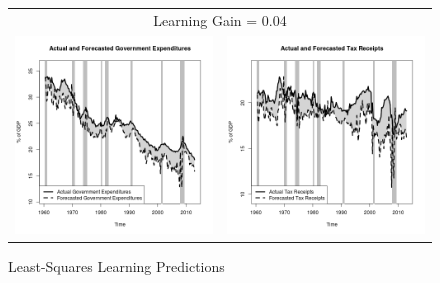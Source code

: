 \documentclass[11pt]{article}
\begin{document}
\begin{figure}\caption{Least-Squares Learning Predictions}\label{fg:forecasts0.04}
\begin{center}
\begin{tabular}{cc}
\multicolumn{2}{c}{Learning Gain = 0.04} \\ [0.5pc]
\includegraphics[scale=0.45]{./results/pics0.04/pred_gov.png} & \includegraphics[scale=0.45]{./results/pics0.04/pred_tax.png} \\

\end{tabular}
\end{center}
\end{figure}
\end{document}
